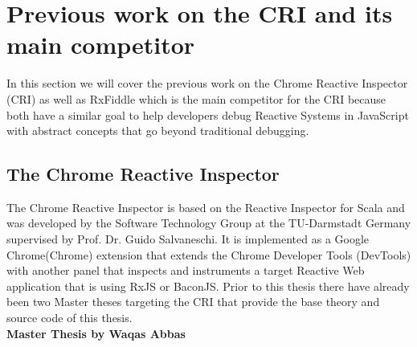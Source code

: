 \section{Previous work on the CRI and its main competitor}
In this section we will cover the previous work on the Chrome Reactive Inspector (CRI) as well as RxFiddle which is the main competitor for the CRI because both have a similar goal to help developers debug Reactive Systems in JavaScript with abstract concepts that go beyond traditional debugging.

	\subsection{The Chrome Reactive Inspector}
	\label{sec:PreviousCRI}
	The Chrome Reactive Inspector is based on the Reactive Inspector for Scala \cite{ReactiveInspector} and was developed by the Software Technology Group at the TU-Darmstadt Germany supervised by Prof. Dr. Guido Salvaneschi. It is implemented as a Google Chrome(Chrome) extension that extends the Chrome Developer Tools (DevTools) with another panel that inspects and instruments a target Reactive Web application that is using RxJS or BaconJS. Prior to this thesis there have already been two Master theses targeting the CRI that provide the base theory and source code of this thesis.\\
	
	\textbf{Master Thesis by Waqas Abbas}\\
	
